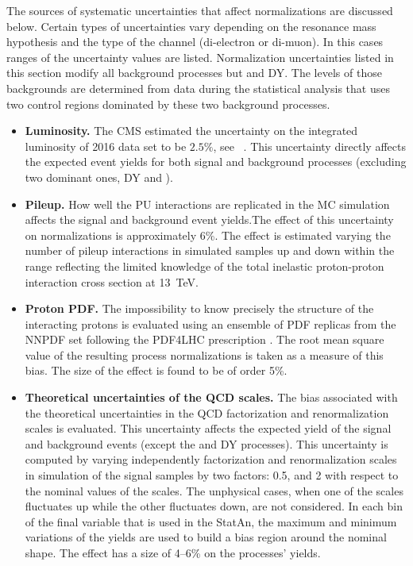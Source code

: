 The sources of systematic uncertainties that affect normalizations are discussed below. Certain types of uncertainties vary depending on the resonance mass hypothesis and the type of the channel (di-electron or di-muon). In this cases ranges of the uncertainty values are listed. Normalization uncertainties listed in this section modify all background processes but \ttbar and DY. The levels of those backgrounds are determined from data during the statistical analysis that uses two control regions dominated by these two background processes.
  
\begin{itemize}

\item{\bf Luminosity.} 
The CMS estimated the uncertainty on the integrated luminosity of 2016 data set to be $2.5\%$, see ~\cite{CMS-PAS-LUM-17-001}. This uncertainty directly affects the expected event yields for both signal and background processes (excluding two dominant ones, DY and \ttbar).
  
\item{\bf Pileup.} 
How well the PU interactions are replicated in the MC simulation affects the signal and background event yields.The effect of this uncertainty on normalizations is approximately 6\%. The effect is estimated varying the number of pileup interactions in simulated samples up and down within the range reflecting the limited knowledge of the total inelastic proton-proton interaction cross section at 13~TeV. 

\item{\bf Proton PDF.} 
The impossibility to know precisely the structure of the interacting protons is evaluated using an ensemble of PDF
  replicas from the NNPDF set \cite{Ball:2014uwa} following the
  PDF4LHC prescription \cite{Botje:2011sn,Alekhin:2011sk}. The root mean square value of the resulting process normalizations is taken as a measure of this bias. The size of the effect is found to be of order 5\%. 

\item{\bf Theoretical uncertainties of the QCD scales.} 
The bias associated with the theoretical uncertainties in the QCD factorization and renormalization scales is evaluated. This uncertainty affects the expected yield of the signal and background events (except the \ttbar and DY processes). This uncertainty is computed by varying independently factorization and renormalization scales in simulation of the signal samples by two factors: 0.5, and 2 with respect to the nominal values of the scales. The unphysical cases, when one of the scales fluctuates up while the other fluctuates down, are not considered. In each bin of the final variable that is used in the StatAn, the maximum and minimum variations of the yields are used to build a bias region around the nominal shape. The effect has a size of 4--6\% on the processes' yields.














\end{itemize}
